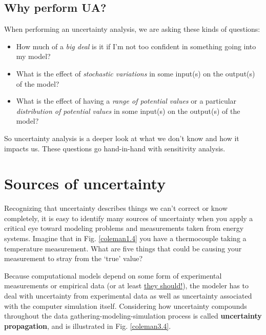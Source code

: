 \documentclass[10pt]{article}
\begin{document}
\subsection{Why perform UA?}

When performing an uncertainty analysis, we are asking these kinds of questions:

\begin{itemize}
\item How much of a \textit{big deal} is it if I'm not too confident in something going into my model?
\item What is the effect of \textit{stochastic variations} in some input(s) on the output(s) of the model?
\item  What is the effect of having a \textit{range of potential values} or a particular \textit{distribution of potential values} in some input(s) on the output(s) of the model?
\end{itemize}

So uncertainty analysis is a deeper look at what we don't know and how it impacts us. These questions go hand-in-hand with sensitivity analysis.

\section{Sources of uncertainty}

Recognizing that uncertainty describes things we can't correct or know completely, it is easy to identify many sources of uncertainty when you apply a critical eye toward modeling problems and measurements taken from energy systems. Imagine that in Fig. \ref{coleman1.4} you have a thermocouple taking a temperature measurement. What are five things that could be causing your measurement to stray from the `true' value?

Because computational models depend on some form of experimental measurements or empirical data (or at least \href{https://en.wikipedia.org/wiki/Verification_and_validation_of_computer_simulation_models}{they should!}), the modeler has to deal with uncertainty from experimental data as well as uncertainty associated with the computer simulation itself. Considering how uncertainty compounds throughout the data gathering-modeling-simulation process is called \textbf{uncertainty propagation}, and is illustrated in Fig. \ref{coleman3.4}.
\end{document}
